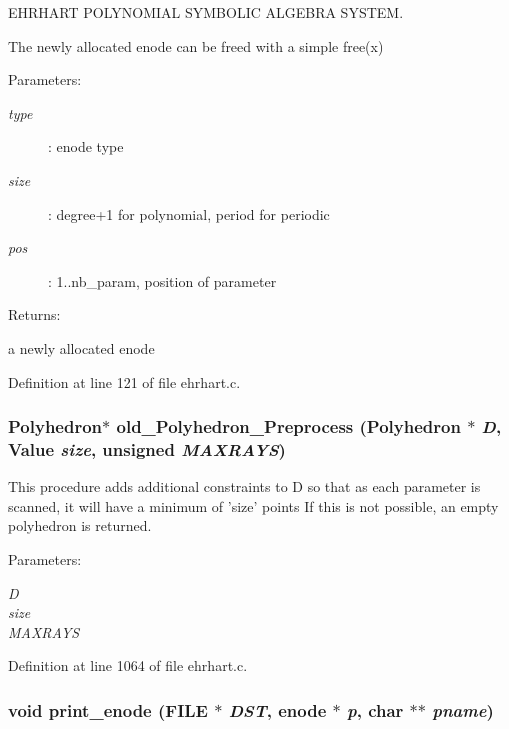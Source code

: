 EHRHART POLYNOMIAL SYMBOLIC ALGEBRA SYSTEM.

The newly allocated enode can be freed with a simple free(x)\begin{Desc}
\item[Parameters: ]\par
\begin{description}
\item[{\em 
type}]: enode type \item[{\em 
size}]: degree+1 for polynomial, period for periodic \item[{\em 
pos}]: 1..nb\_\-param, position of parameter  \end{description}
\end{Desc}
\begin{Desc}
\item[Returns: ]\par
a newly allocated enode \end{Desc}


Definition at line 121 of file ehrhart.c.
\subsubsection{\setlength{\rightskip}{0pt plus 5cm}Polyhedron$\ast$ old\_\-Polyhedron\_\-Preprocess (Polyhedron $\ast$ {\em D}, Value {\em size}, unsigned {\em MAXRAYS})}\label{ehrhart_8c_a22}


This procedure adds additional constraints to D so that as each parameter is scanned, it will have a minimum of 'size' points If this is not possible, an empty polyhedron is returned.

\begin{Desc}
\item[Parameters: ]\par
\begin{description}
\item[{\em 
D}]\item[{\em 
size}]\item[{\em 
MAXRAYS}]\end{description}
\end{Desc}


Definition at line 1064 of file ehrhart.c.
\subsubsection{\setlength{\rightskip}{0pt plus 5cm}void print\_\-enode (FILE $\ast$ {\em DST}, enode $\ast$ {\em p}, char $\ast$$\ast$ {\em pname})}\label{ehrhart_8c_a11}


